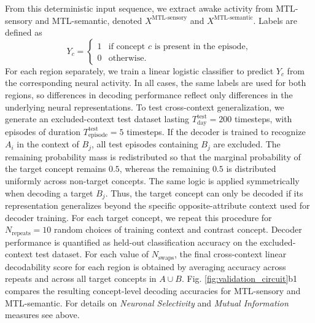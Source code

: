\documentclass{article}
\begin{document}
From this deterministic input sequence, we extract awake activity from MTL-sensory and MTL-semantic, denoted $X^\textrm{MTL-sensory}$ and $X^\textrm{MTL-semantic}$. Labels are defined as
\[
Y_c =
\begin{cases}
1 & \text{if concept } c \text{ is present in the episode},\\
0 & \text{otherwise.}
\end{cases}
\]
For each region separately, we train a linear logistic classifier to predict $Y_c$ from the corresponding neural activity. In all cases, the same labels are used for both regions, so differences in decoding performance reflect only differences in the underlying neural representations.
\newline\newline
To test cross-context generalization, we generate an excluded-context test dataset lasting $T_{\textrm{day}}^{\textrm{test}}=200$ timesteps, with episodes of duration $T_{\textrm{episode}}^{\textrm{test}}=5$ timesteps. If the decoder is trained to recognize $A_i$ in the context of $B_j$, all test episodes containing $B_j$ are excluded. The remaining probability mass is redistributed so that the marginal probability of the target concept remains $0.5$, whereas the remaining $0.5$ is distributed uniformly across non-target concepts. The same logic is applied symmetrically when decoding a target $B_j$. Thus, the target concept can only be decoded if its representation generalizes beyond the specific opposite-attribute context used for decoder training.
\newline\newline
For each target concept, we repeat this procedure for $N_{\textrm{repeats}}=10$ random choices of training context and contrast concept. Decoder performance is quantified as held-out classification accuracy on the excluded-context test dataset. For each value of $N_{\textrm{swaps}}$, the final cross-context linear decodability score for each region is obtained by averaging accuracy across repeats and across all target concepts in $A\cup B$. Fig. \ref{fig:validation_circuit}b1 compares the resulting concept-level decoding accuracies for MTL-sensory and MTL-semantic.
\newline\newline
For details on \textit{Neuronal Selectivity} and \textit{Mutual Information} measures see above.
\end{document}
